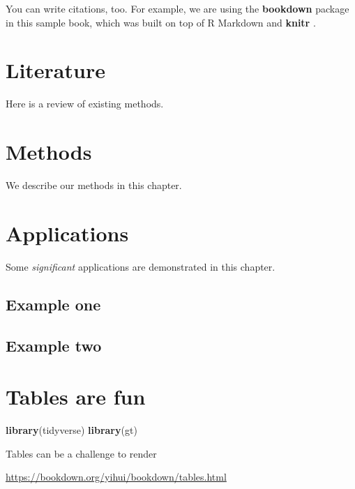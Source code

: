 \documentclass[
]{book}
\newenvironment{Shaded}{\begin{snugshade}}{\end{snugshade}}
\newcommand{\KeywordTok}[1]{\textcolor[rgb]{0.13,0.29,0.53}{\textbf{#1}}}
\newcommand{\NormalTok}[1]{#1}
\begin{document}
You can write citations, too. For example, we are using the \textbf{bookdown} package \citep{R-bookdown} in this sample book, which was built on top of R Markdown and \textbf{knitr} \citep{xie2015}.

\hypertarget{literature}{%
\chapter{Literature}\label{literature}}

Here is a review of existing methods.

\hypertarget{methods}{%
\chapter{Methods}\label{methods}}

We describe our methods in this chapter.

\hypertarget{applications}{%
\chapter{Applications}\label{applications}}

Some \emph{significant} applications are demonstrated in this chapter.

\hypertarget{example-one}{%
\section{Example one}\label{example-one}}

\hypertarget{example-two}{%
\section{Example two}\label{example-two}}

\hypertarget{tables}{%
\chapter{Tables are fun}\label{tables}}

\begin{Shaded}
\begin{Highlighting}[]
\KeywordTok{library}\NormalTok{(tidyverse)}
\KeywordTok{library}\NormalTok{(gt)}
\end{Highlighting}
\end{Shaded}

Tables can be a challenge to render

\url{https://bookdown.org/yihui/bookdown/tables.html}
\end{document}
